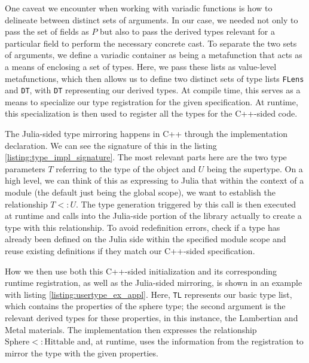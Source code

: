 \begin{listing}[ht!]
  
  \caption{Type initialization signature}
  \label{listing:init_type_signature}
\end{listing}

One caveat we encounter when working with variadic functions is how to delineate between distinct sets of arguments. In our case, we needed not only to pass the set of fields as $P$ but also to pass the derived types relevant for a particular field to perform the necessary concrete cast. To separate the two sets of arguments, we define a variadic container as being a metafunction that acts as a means of enclosing a set of types. Here, we pass these lists as value-level metafunctions, which then allows us to define two distinct sets of type lists \texttt{FLens} and \texttt{DT}, with \texttt{DT} representing our derived types. At compile time, this serves as a means to specialize our type registration for the given specification. At runtime, this specialization is then used to register all the types for the C++-sided code. 

The Julia-sided type mirroring happens in C++ through the implementation declaration. We can see the signature of this in the listing \ref{listing:type_impl_signature}. The most relevant parts here are the two type parameters $T$ referring to the type of the object and $U$ being the supertype. On a high level, we can think of this as expressing to Julia that within the context of a module (the default just being the global scope), we want to establish the relationship $T <: U$. The type generation triggered by this call is then executed at runtime and calls into the Julia-side portion of the library actually to create a type with this relationship. To avoid redefinition errors, check if a type has already been defined on the Julia side within the specified module scope and reuse existing definitions if they match our C++-sided specification. 

\begin{listing}[ht!]
  
  \caption{Type implementation signature}
  \label{listing:type_impl_signature}
\end{listing}

How we then use both this C++-sided initialization and its corresponding runtime registration, as well as the Julia-sided mirroring, is shown in an example with listing \ref{listing:usertype_ex_appl}. Here, \texttt{TL} represents our basic type list, which contains the properties of the sphere type; the second argument is the relevant derived types for these properties, in this instance, the Lambertian and Metal materials. The implementation then expresses the relationship $\text{Sphere} <: \text{Hittable}$ and, at runtime, uses the information from the registration to mirror the type with the given properties.

